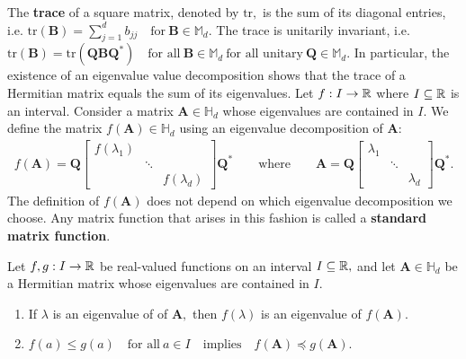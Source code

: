   The \textbf{trace} of a square matrix, denoted by $\mathrm{tr},$
  is the sum of its diagonal entries, i.e. 
  $
    \mathrm{tr}(\mathbf{B})
    =
    \sum_{j=1}^{d}b_{jj}
    \quad 
    \text{for}\ 
    \mathbf{B} \in \mathbb{M}_d.
  $
  The trace is unitarily invariant, i.e.
  $
    \mathrm{tr}(\mathbf{B})
    =
    \mathrm{tr}(\mathbf{Q}\mathbf{B}\mathbf{Q}^*)
    \quad 
    \text{for all}
    \ 
    \mathbf{B}\in \mathbb{M}_d
    \ 
    \text{for all unitary}\ 
    \mathbf{Q} \in \mathbb{M}_d.
  $
  In particular, the existence of an eigenvalue value decomposition shows 
  that the trace of a Hermitian matrix equals the sum of its  eigenvalues.
  Let
  $
  f: I\to \mathbb{R}
  $
  where 
  $I\subseteq\mathbb{R}$ 
  is an interval.
  Consider a matrix 
  $\mathbf{A}\in \mathbb{H}_d$
  whose eigenvalues are contained in $I.$
  We define the matrix 
  $
    f(\mathbf{A})\in \mathbb{H}_d
  $
  using an eigenvalue decomposition of $\mathbf{A}:$
  \begin{gather}
    f(\mathbf{A})
    =
    \mathbf{Q}
    \begin{bmatrix}
      f(\lambda_1) &&\\
                   &\ddots&\\
                   && f(\lambda_d)
    \end{bmatrix}
    \mathbf{Q}^*
    \qquad
    \text{where}
    \qquad
    \mathbf{A}
    =
    \mathbf{Q}
    \begin{bmatrix}
      \lambda_1 &&\\
                   &\ddots&\\
                   && \lambda_d
    \end{bmatrix}
    \mathbf{Q}^*
    .
  \end{gather}
  The definition of $f(\mathbf{A})$ does not depend on which 
  eigenvalue decomposition we choose.
  Any matrix function that arises in this fashion is called a \textbf{standard matrix function}.


\begin{proposition}
  Let
  $
  f,g: I\to \mathbb{R}
  $
  be real-valued functions on an interval $I\subseteq\mathbb{R},$ 
  and let
  $\mathbf{A}\in \mathbb{H}_d$
  be a Hermitian matrix
  whose eigenvalues are contained in $I.$

  \begin{enumerate}[label={(\roman*)}]
    \item
      If $\lambda$ is an eigenvalue of of $\mathbf{A},$
      then $f(\lambda)$ is an eigenvalue of $f(\mathbf{A}).$
    \item
      $
        f(a)
        \le
        g(a)
        \quad
        \text{for all}\ 
        a\in I
        \quad
        \text{implies}
        \quad
        f(\mathbf{A})
        \preccurlyeq
        g(\mathbf{A})
        .
      $
  \end{enumerate}
\end{proposition}


